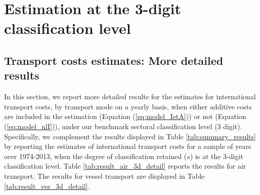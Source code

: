 \documentclass[a4paper,11pt]{article}
\begin{document}
\clearpage
\setcounter{table}{0}
\setcounter{figure}{0}
\renewcommand{\thefigure}{B.\arabic{figure}}
\renewcommand{\thetable}{B.\arabic{table}}

\section{Estimation at the 3-digit classification level \label{app:more_results}}

\subsection{Transport costs estimates: More detailed results}

In this section, we report more detailed results for the estimates for international transport costs, by transport mode on a yearly basis, when either additive costs are included in the estimation (Equation (\ref{eq:model_IetA})) or not (Equation (\ref{eq:model_nlI})), under our benchmark sectoral classification level (3 digit).
Specifically, we complement the results displayed in Table \ref{tab:summary_results} by reporting the estimates of international transport costs for a sample of years over 1974-2013, when the degree of classification retained ($s$) is at the 3-digit classification level.
Table \ref{tab:result_air_3d_detail} reports the results for air transport.
The results for vessel transport are displayed in Table \ref{tab:result_ves_3d_detail}.
\end{document}
